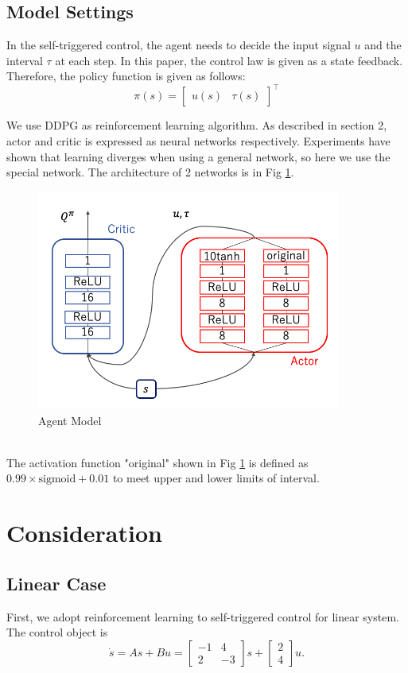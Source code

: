 \documentclass[english, dvipdfmx]{ampmt}             %
\begin{document}
\subsection{Model Settings}
In the self-triggered control, the agent needs to decide  the input signal $u$ and the interval $\tau$ at each step. In this paper, the control law is given as a state feedback. Therefore, the policy function is given as follows:
\begin{equation}
	\pi(s) = \begin{bmatrix}u(s) & \tau(s)\end{bmatrix}^{\top}
\end{equation}\par
We use DDPG as reinforcement learning algorithm. As described in section 2, actor and critic is expressed as neural networks respectively. Experiments have shown that learning diverges when using a general network, so here we use the special network. The architecture of 2 networks is in Fig \ref{NN}.
\begin{figure}[h]
	\centering
 	\includegraphics[width=10cm]{model.png}
 	\caption{Agent Model} \label{NN}
\end{figure}\\
The activation function "original" shown in Fig \ref{NN} is defined as $0.99 \times \textrm{sigmoid} + 0.01$ to meet upper and lower limits of interval.


\section{Consideration}

\subsection{Linear Case}
First, we adopt reinforcement learning to self-triggered control for linear system. The control object is
\begin{equation}
	\dot{s} = As + Bu = \begin{bmatrix}-1& 4 \\ 2 & -3\end{bmatrix}s + \begin{bmatrix}2 \\ 4\end{bmatrix}u.
\end{equation}
\end{document}
